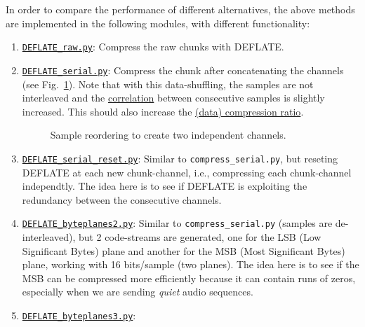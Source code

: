 In order to compare the performance of different alternatives, the
above methods are implemented in the following modules, with different
functionality:

\begin{enumerate}
\item
  \href{https://github.com/Tecnologias-multimedia/InterCom/blob/master/src/DEFLATE\_raw.py}{\texttt{DEFLATE\_raw.py}}:
  Compress the raw chunks with DEFLATE.
\item
  \href{https://github.com/Tecnologias-multimedia/InterCom/blob/master/src/DEFLATE\_serial.py}{\texttt{DEFLATE\_serial.py}}:
  Compress the chunk after concatenating the channels (see
  Fig.~\ref{fig:reordering}). Note that with this data-shuffling,
  the samples are not interleaved and the
  \href{https://en.wikipedia.org/wiki/Correlation}{correlation}
  between consecutive samples is slightly increased. This should also
  increase the
  \href{https://en.wikipedia.org/wiki/Data_compression_ratio}{(data)
    compression ratio}.
\begin{figure}
  \begin{center}
  \end{center}
  \caption{Sample reordering to create two independent channels.}
  \label{fig:reordering}
\end{figure}
\item
  \href{https://github.com/Tecnologias-multimedia/InterCom/blob/master/src/DEFLATE\_serial\_reset.py}{\texttt{DEFLATE\_serial\_reset.py}}:
  Similar to \verb|compress_serial.py|, but reseting DEFLATE at each
  new chunk-channel, i.e., compressing each chunk-channel
  independtly. The idea here is to see if DEFLATE is exploiting the
  redundancy between the consecutive channels.
\item
  \href{https://github.com/Tecnologias-multimedia/InterCom/blob/master/src/DEFLATE\_byteplanes2.py}{\texttt{DEFLATE\_byteplanes2.py}}:
  Similar to \verb|compress_serial.py| (samples are de-interleaved),
  but 2 code-streams are generated, one for the LSB (Low Significant
  Bytes) plane and another for the MSB (Most Significant Bytes) plane,
  working with 16 bits/sample (two planes). The idea here is to see if the MSB can
  be compressed more efficiently because it can contain runs of zeros,
  especially when we are sending \emph{quiet} audio sequences.
\item
  \href{https://github.com/Tecnologias-multimedia/InterCom/blob/master/src/DEFLATE\_byteplanes3.py}{\texttt{DEFLATE\_byteplanes3.py}}:

\end{enumerate}
